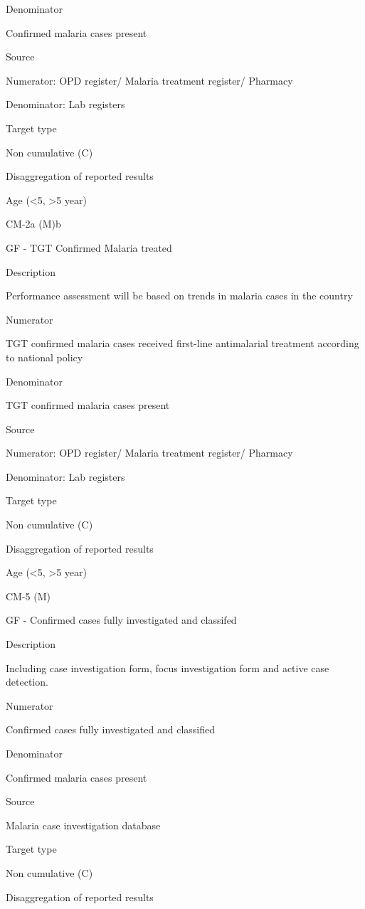 \documentclass[]{book}
\begin{document}
Denominator

Confirmed malaria cases present

Source

Numerator: OPD register/
Malaria treatment register/
Pharmacy

Denominator: Lab registers

Target type

Non cumulative (C)

Disaggregation of reported results

Age (\textless{}5, \textgreater{}5 year)

CM-2a (M)b

GF - TGT Confirmed Malaria treated

Description

Performance assessment will be based on trends in malaria cases in the country

Numerator

TGT confirmed malaria cases received first-line antimalarial treatment according to national policy

Denominator

TGT confirmed malaria cases present

Source

Numerator: OPD register/
Malaria treatment register/
Pharmacy

Denominator: Lab registers

Target type

Non cumulative (C)

Disaggregation of reported results

Age (\textless{}5, \textgreater{}5 year)

CM-5 (M)

GF - Confirmed cases fully investigated and classifed

Description

Including case investigation form, focus investigation form and active case detection.

Numerator

Confirmed cases fully investigated and classified

Denominator

Confirmed malaria cases present

Source

Malaria case investigation database

Target type

Non cumulative (C)

Disaggregation of reported results
\end{document}
